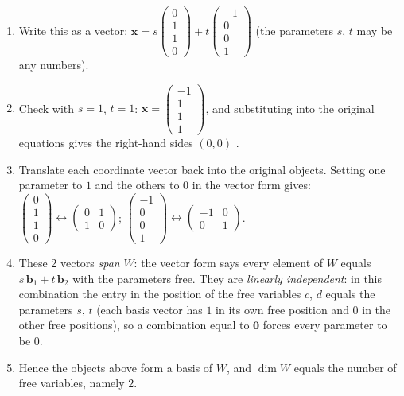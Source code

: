 \documentclass[11pt]{article}
\begin{document}
\begin{tcolorbox}[breakable,colback=ans,colframe=ansb,boxrule=0.5pt,left=4pt,right=4pt,top=2pt,bottom=2pt]
\begin{enumerate}[leftmargin=3.1em,itemsep=1pt,topsep=1pt,label=\textbf{Step \arabic*.}]
\item Write this as a vector: $\displaystyle \mathbf x=s\begin{pmatrix}0\\1\\1\\0\end{pmatrix}+t\begin{pmatrix}-1\\0\\0\\1\end{pmatrix}$ (the parameters $s$, $t$ may be any numbers).
\item Check with $s=1$, $t=1$: $\mathbf x=\begin{pmatrix}-1\\1\\1\\1\end{pmatrix}$, and substituting into the original equations gives the right-hand sides $(0,0)$ \checkmark.
\item Translate each coordinate vector back into the original objects. Setting one parameter to $1$ and the others to $0$ in the vector form gives: $\begin{pmatrix}0\\1\\1\\0\end{pmatrix}\leftrightarrow \begin{pmatrix}0 & 1 \\ 1 & 0\end{pmatrix}$; $\begin{pmatrix}-1\\0\\0\\1\end{pmatrix}\leftrightarrow \begin{pmatrix}-1 & 0 \\ 0 & 1\end{pmatrix}$.
\item These 2 vectors \emph{span} $W$: the vector form says every element of $W$ equals $s\,\mathbf b_1+t\,\mathbf b_2$ with the parameters free. They are \emph{linearly independent}: in this combination the entry in the position of the free variables $c$, $d$ equals the parameters $s$, $t$ (each basis vector has $1$ in its own free position and $0$ in the other free positions), so a combination equal to $\mathbf 0$ forces every parameter to be $0$.
\item Hence the objects above form a basis of $W$, and $\dim W$ equals the number of free variables, namely $2$.

\end{enumerate}
\end{tcolorbox}
\end{document}
